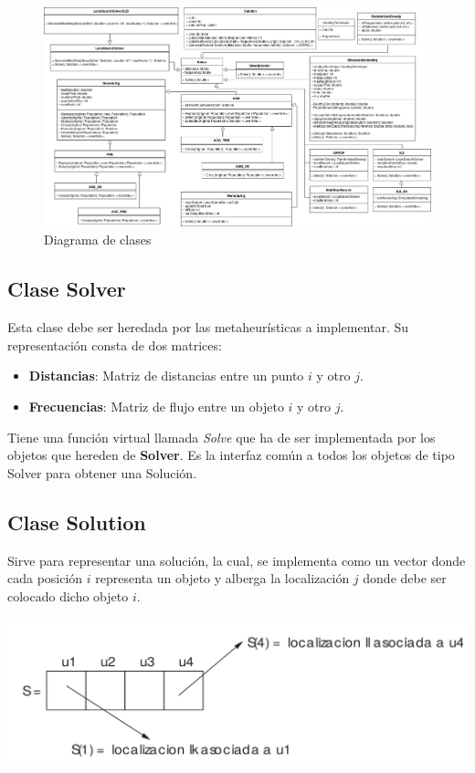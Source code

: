 \documentclass[a4paper, 12pt]{article}
\begin{document}
   \vspace*{0cm}
   \begin{figure}[H]
      \centering
      \hspace*{-3.5cm}\includegraphics[scale=0.4]{mhClassDiagram}
      \caption{Diagrama de clases}
   \end{figure}
   
   \newpage
   \subsection{Clase Solver}
   Esta clase debe ser heredada por las metaheurísticas a implementar. Su representación consta de dos matrices:
   \begin{itemize}
      \item \textbf{Distancias}: Matriz de distancias entre un punto $i$ y otro $j$.
      \item \textbf{Frecuencias}: Matriz de flujo entre un objeto $i$ y otro $j$. 
   \end{itemize}
   Tiene una función virtual llamada \textit{Solve} que ha de ser implementada por los objetos que hereden de \textbf{Solver}. Es la interfaz común a todos los objetos de tipo Solver para obtener una Solución.

   \subsection{Clase Solution}
   Sirve para representar una solución, la cual, se implementa como un vector donde cada posición $i$ representa un objeto y alberga la localización $j$ donde debe ser colocado dicho objeto $i$. 
   
   \begin{center}
      \includegraphics[scale=0.14]{solRep}
   \end{center}
   
\end{document}
